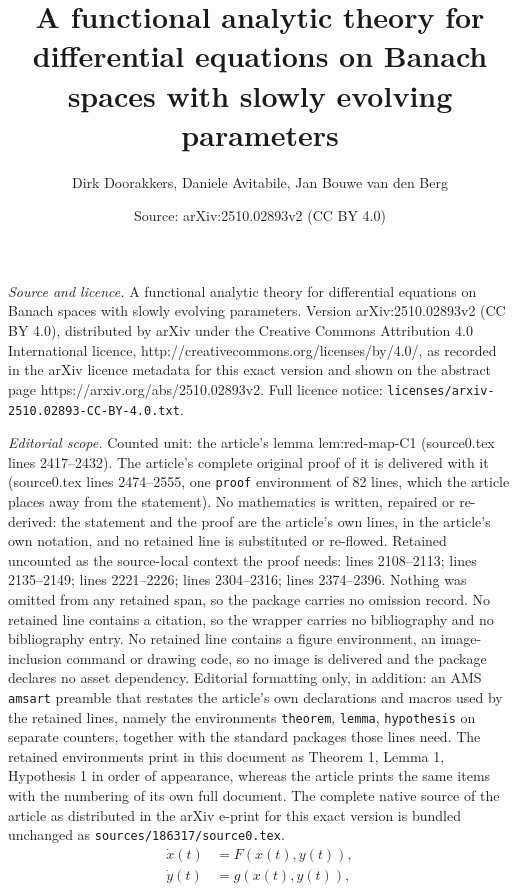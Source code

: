 \documentclass[10pt,a4paper]{amsart}
\title{A functional analytic theory for differential equations on Banach spaces with slowly evolving parameters}
\author{Dirk Doorakkers, Daniele Avitabile, Jan Bouwe van den Berg}
\date{Source: arXiv:2510.02893v2 (CC BY 4.0)}
\begin{document}
\maketitle

\noindent\emph{Source and licence.} A functional analytic theory for differential equations on Banach spaces with slowly evolving parameters. Version arXiv:2510.02893v2 (CC BY 4.0), distributed by arXiv under the Creative Commons Attribution 4.0 International licence, http://creativecommons.org/licenses/by/4.0/, as recorded in the arXiv licence metadata for this exact version and shown on the abstract page https://arxiv.org/abs/2510.02893v2. Full licence notice: \texttt{licenses/arxiv-2510.02893-CC-BY-4.0.txt}.\par\smallskip

\noindent\textit{Editorial scope.} Counted unit: the article's lemma lem:red-map-C1 (source0.tex lines 2417--2432). The article's complete original proof of it is delivered with it (source0.tex lines 2474--2555, one \texttt{proof} environment of 82 lines, which the article places away from the statement). No mathematics is written, repaired or re-derived: the statement and the proof are the article's own lines, in the article's own notation, and no retained line is substituted or re-flowed.  Retained uncounted as the source-local context the proof needs: lines 2108--2113; lines 2135--2149; lines 2221--2226; lines 2304--2316; lines 2374--2396.  Nothing was omitted from any retained span, so the package carries no omission record.  No retained line contains a citation, so the wrapper carries no bibliography and no bibliography entry.  No retained line contains a figure environment, an image-inclusion command or drawing code, so no image is delivered and the package declares no asset dependency.  Editorial formatting only, in addition: an AMS \texttt{amsart} preamble that restates the article's own declarations and macros used by the retained lines, namely the environments \texttt{theorem}, \texttt{lemma}, \texttt{hypothesis} on separate counters, together with the standard packages those lines need.  The retained environments print in this document as Theorem 1, Lemma 1, Hypothesis 1 in order of appearance, whereas the article prints the same items with the numbering of its own full document.  The complete native source of the article as distributed in the arXiv e-print for this exact version is bundled unchanged as \texttt{sources/186317/source0.tex}.
 \begin{equation}\label{ODE-system-red}
 \begin{aligned}
 \dot{x}(t) &= F(x(t),y(t)), \\
 \dot{y}(t) &= g(x(t),y(t)),
 \end{aligned}
 \end{equation}
\end{document}
